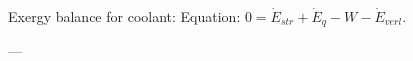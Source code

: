 Exergy balance for coolant:  
Equation:  
\( 0 = \dot{E}_{str} + \dot{E}_{q} - W - \dot{E}_{verl} \).  

---